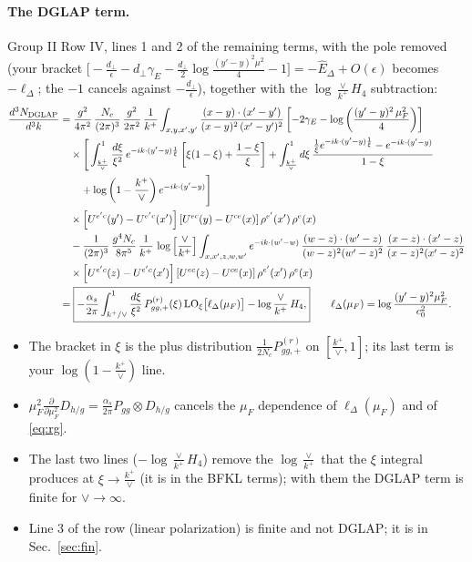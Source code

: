 \documentclass[9pt]{article}
\numberwithin{equation}{section}
\begin{document}
\paragraph{The DGLAP term.} Group II Row IV, lines 1 and 2 of the remaining terms, with the pole removed (your bracket $\big[-\frac{d_\perp}{\epsilon}-d_\perp\gamma_E-\frac{d_\perp}{2}\log\frac{(y'-y)^2\mu^2}{4}-1\big]=-\hat E_\Delta+O(\epsilon)$ becomes $-\ell_\Delta$; the $-1$ cancels against $-\frac{d_\perp}{\epsilon}$), together with the $\log\frac{\vee}{k^+}H_4$ subtraction:
\begin{align}
\frac{d^{3}N_{\rm DGLAP}}{d^{3}k}&=\frac{g^{2}}{4\pi^{2}}\,\frac{N_{c}}{(2\pi)^{3}}\,\frac{g^{2}}{2\pi^{2}}\,\frac{1}{k^{+}}\int_{x,y,x',y'}\frac{(x-y)\cdot(x'-y')}{(x-y)^{2}\,(x'-y')^{2}}\left[-2\gamma_{E}-\log\left(\frac{(y'-y)^{2}\,\mu_{F}^{2}}{4}\right)\right]\notag\\
&\quad\times\Bigg[\int_{\frac{k^{+}}{\vee}}^{1}\frac{d\xi}{\xi^{2}}\,e^{-ik\cdot(y'-y)\frac{1}{\xi}}\left[\xi(1-\xi)+\frac{1-\xi}{\xi}\right]+\int_{\frac{k^{+}}{\vee}}^{1}d\xi\,\frac{\frac{1}{\xi}e^{-ik\cdot(y'-y)\frac{1}{\xi}}-e^{-ik\cdot(y'-y)}}{1-\xi}\notag\\
&\qquad+\log\left(1-\frac{k^{+}}{\vee}\right)e^{-ik\cdot(y'-y)}\Bigg]\notag\\
&\quad\times\left[U^{e'c}(y')-U^{e'c}(x')\right]\left[U^{ec}(y)-U^{ce}(x)\right]\rho^{e'}(x')\,\rho^{e}(x)\notag\\
&\quad-\frac{1}{(2\pi)^{3}}\,\frac{g^{4}N_{c}}{8\pi^{5}}\,\frac{1}{k^{+}}\,\log{\left[\frac{\vee}{k^{+}}\right]}\int_{x,x',z,w,w'}e^{-ik\cdot(w'-w)}\,\frac{(w-z)\cdot(w'-z)}{(w-z)^{2}(w'-z)^{2}}\,\frac{(x-z)\cdot(x'-z)}{(x-z)^{2}(x'-z)^{2}}\notag\\
&\quad\times\left[U^{e'c}(z)-U^{e'c}(x')\right]\left[U^{ec}(z)-U^{ce}(x)\right]\rho^{e'}(x')\,\rho^{e}(x)\notag\\
&=\boxed{-\frac{\alpha_s}{2\pi}\int_{k^+/\vee}^{1}\frac{d\xi}{\xi^{2}}\,P^{(r)}_{gg,+}(\xi)\,{\rm LO}_\xi\big[\ell_\Delta(\mu_F)\big]-\log\frac{\vee}{k^+}\,H_4,}\qquad \ell_\Delta(\mu_F)=\log\frac{(y'-y)^2\mu_F^2}{c_0^2}.
\label{eq:dglap}
\end{align}
\begin{itemize}
\item The bracket in $\xi$ is the plus distribution $\frac{1}{2N_c}P^{(r)}_{gg,+}$ on $[\frac{k^+}{\vee},1]$; its last term is your $\log(1-\frac{k^+}{\vee})$ line.
\item $\mu_F^2\frac{\partial}{\partial\mu_F^2}D_{h/g}=\frac{\alpha_s}{2\pi}P_{gg}\otimes D_{h/g}$ cancels the $\mu_F$ dependence of $\ell_\Delta(\mu_F)$ and of \eqref{eq:rg}.
\item The last two lines ($-\log\frac{\vee}{k^+}H_4$) remove the $\log\frac{\vee}{k^+}$ that the $\xi$ integral produces at $\xi\to\frac{k^+}{\vee}$ (it is in the BFKL terms); with them the DGLAP term is finite for $\vee\to\infty$.
\item Line 3 of the row (linear polarization) is finite and not DGLAP; it is in Sec.~\ref{sec:fin}.
\end{itemize}
\end{document}
